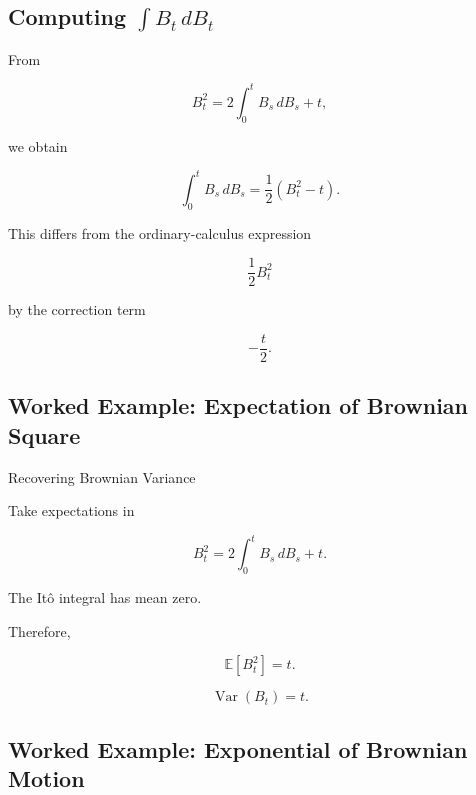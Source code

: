 \subsection{Computing \(\int B_t\,dB_t\)}
\label{subsec:integral-b-db}

From

\[
B_t^2
=
2\int_0^t
B_s\,dB_s+t,
\]

we obtain

\[
\boxed{
\int_0^t
B_s\,dB_s
=
\frac12
(B_t^2-t).
}
\]

This differs from the ordinary-calculus expression

\[
\frac12B_t^2
\]

by the correction term

\[
-\frac{t}{2}.
\]

\subsection{Worked Example: Expectation of Brownian Square}
\label{subsec:worked-expectation-brownian-square}

\begin{workedexamplebox}{Recovering Brownian Variance}

Take expectations in

\[
B_t^2
=
2\int_0^tB_s\,dB_s+t.
\]

The It\^o integral has mean zero.

Therefore,

\[
\mathbb{E}[B_t^2]
=
t.
\]

\begin{answerbox}
\[
\boxed{
\operatorname{Var}(B_t)=t.
}
\]
\end{answerbox}

\end{workedexamplebox}

\subsection{Worked Example: Exponential of Brownian Motion}
\label{subsec:worked-ito-exp-brownian}


